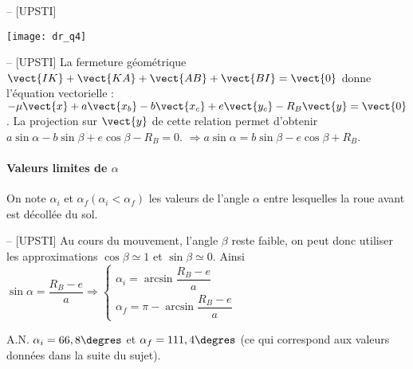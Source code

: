 \ifprof
\begin{corrige}-- [UPSTI]
\end{corrige}
\else
\fi

\begin{center}
\texttt{[image: dr\_q4]}
\end{center}

\ifprof
\begin{corrige}-- [UPSTI]
La fermeture géométrique $\vect{IK}+\vect{KA}+\vect{AB}+\vect{BI}=\vect{0}$ donne l’équation vectorielle :
$-\mu\vect{x}+a\vect{x_b}-b\vect{x_c}+e\vect{y_c}-R_B \vect{y} = \vect{0}$.
La projection sur  $\vect{y}$ de cette relation permet d’obtenir $a\sin\alpha -b\sin\beta +e\cos\beta-R_B=0$.
$\Rightarrow  a\sin\alpha =b\sin\beta -e\cos\beta +R_B$.

\end{corrige}
\else
\fi

\paragraph*{Valeurs limites de \(\alpha\)} On note \(\alpha_{i}\) et \(\alpha_{f}\left(\alpha_{i}<\alpha_{f}\right)\) les valeurs de l'angle \(\alpha\) entre lesquelles la roue avant est décollée du sol.

\ifprof
\begin{corrige}-- [UPSTI]
Au cours du mouvement, l’angle $\beta$ reste faible, on peut donc utiliser les approximations $\cos\beta\simeq 1$ et $\sin\beta\simeq 0$.
Ainsi $\sin\alpha=\dfrac{R_B-e}{a} \Rightarrow \left\{ \begin{array}{l} 
\alpha_i=\arcsin\dfrac{R_B-e}{a} \\
\alpha_f=\pi -\arcsin \dfrac{R_B-e}{a}
\end{array}\right.$

A.N. $\alpha_i=66,8\degres$ et $\alpha_f=111,4\degres$ (ce qui correspond aux valeurs données dans la suite du sujet).

\end{corrige}
\else
\fi

